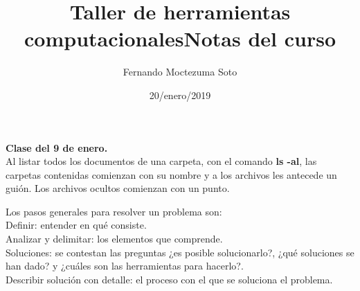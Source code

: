 \documentclass[etterpaper, 12pt, oneside]{article}%
\title{\Huge Taller de herramientas computacionales}
\author{Fernando Moctezuma Soto}
\date{20/enero/2019}
\begin{document}
	\maketitle
	
	\newpage
	
	\title{\Huge Notas del curso\\}
	
	\textbf{Clase del 9 de enero.}\\
	
	Al listar todos los documentos de una carpeta, con el comando \textbf{ls -al}, las carpetas contenidas comienzan con su nombre y a los archivos les antecede un guión. Los archivos ocultos comienzan con un punto.
	
	Los pasos generales para resolver un problema son:\\
	Definir: entender en qué consiste.\\
	Analizar y delimitar: los elementos que comprende.\\
	Soluciones: se contestan las preguntas ¿es posible solucionarlo?, ¿qué soluciones se han dado? y ¿cuáles son las herramientas para hacerlo?.\\
	Describir solución con detalle: el proceso con el que se soluciona el problema.
	
	

	
\end{document}
